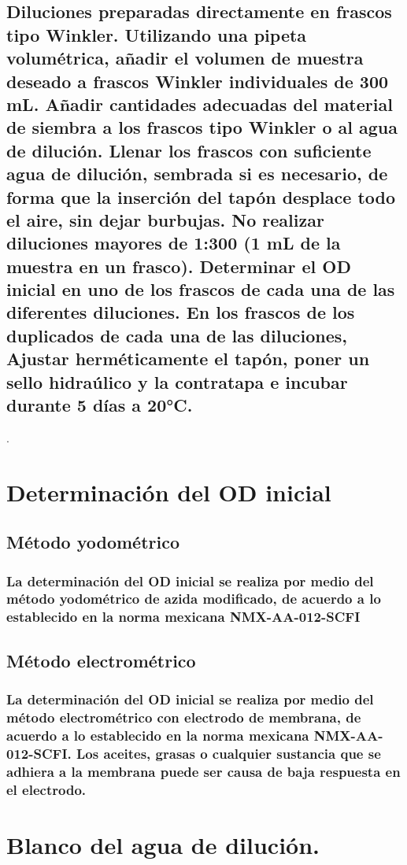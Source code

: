 \documentclass[spanish,12pt,letterpaper,titlepage]{article}
\theoremstyle{definition}
\begin{document}
	\subsection{Diluciones preparadas directamente en frascos tipo Winkler. Utilizando una pipeta volumétrica, añadir el volumen de muestra deseado a frascos Winkler individuales de 300 mL. Añadir cantidades adecuadas del material de siembra a los frascos tipo Winkler o al agua de dilución. Llenar los frascos con suficiente agua de dilución, sembrada si es necesario, de forma que la inserción del tapón desplace todo el aire, sin dejar burbujas. No realizar diluciones mayores de 1:300 (1 mL de la muestra en un frasco). Determinar el OD inicial en uno de los frascos de cada una de las diferentes diluciones. En los frascos de los duplicados de cada una de las diluciones, Ajustar herméticamente el tapón, poner un sello hidraúlico y la contratapa e incubar durante 5 días a 20°C.}\label{10.7.2}.
	\section{Determinación del OD inicial}\label{10.8}
	\subsection{Método yodométrico}\label{10.8.1}
	\subsubsection{La determinación del OD inicial se realiza por medio del método yodométrico de azida modificado, de acuerdo a lo establecido en la norma mexicana NMX-AA-012-SCFI}\label{10.8.1.1}
	\subsection{Método electrométrico}\label{10.8.2}
	\subsubsection{La determinación del OD inicial se realiza por medio del método electrométrico con electrodo de membrana, de acuerdo a lo establecido en la norma mexicana NMX-AA-012-SCFI. Los aceites, grasas o cualquier sustancia que se adhiera a la membrana puede ser causa de baja respuesta en el electrodo.}\label{10.8.2.1}
	\section{Blanco del agua de dilución.}\label{10.9}
\end{document}
